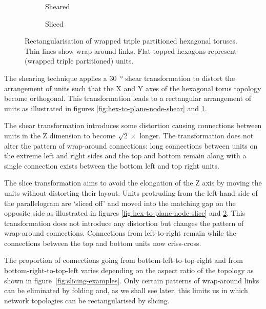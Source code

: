 \begin{figure}
\begin{subfigure}[b]{0.32\linewidth}
					\caption{Sheared}
					\label{fig:hex-to-plane-shear}
				\end{subfigure}
				\begin{subfigure}[b]{0.32\linewidth}
					\center
					
					\caption{Sliced}
					\label{fig:hex-to-plane-slice}
				\end{subfigure}
				
				\caption{Rectangularisation of wrapped triple partitioned hexagonal
				toruses. Thin lines show wrap-around links.  Flat-topped hexagons
				represent (wrapped triple partitioned) units.}
				\label{fig:hex-to-plane}
			\end{figure}
			
			The shearing technique applies a \SI{30}{\degree} shear transformation to
			distort the arrangement of units such that the X and Y axes of the
			hexagonal torus topology become orthogonal. This transformation leads to
			a rectangular arrangement of units as illustrated in figures
			\ref{fig:hex-to-plane-node-shear} and \ref{fig:hex-to-plane-shear}.
			
			The shear transformation introduces some distortion causing connections
			between units in the Z dimension to become $\sqrt{2} \times$ longer. The
			transformation does not alter the pattern of wrap-around connections:
			long connections between units on the extreme left and right sides and
			the top and bottom remain along with a single connection exists between
			the bottom left and top right units.
			
			The slice transformation aims to avoid the elongation of the Z axis by
			moving the units without distorting their layout. Units protruding from
			the left-hand-side of the parallelogram are `sliced off' and moved into
			the matching gap on the opposite side as illustrated in figures
			\ref{fig:hex-to-plane-node-slice} and \ref{fig:hex-to-plane-slice}. This
			transformation does not introduce any distortion but changes the pattern
			of wrap-around connections.  Connections from left-to-right remain while
			the connections between the top and bottom units now criss-cross.
			
			The proportion of connections going from bottom-left-to-top-right and
			from bottom-right-to-top-left varies depending on the aspect ratio of the
			topology as shown in figure~\ref{fig:slicing-examples}. Only certain
			patterns of wrap-around links can be eliminated by folding and, as we
			shall see later, this limits us in which network topologies can be
			rectangularised by slicing.
			
